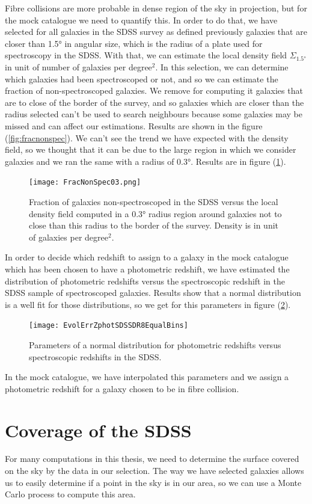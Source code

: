 %
Fibre collisions are more probable in dense region of the sky in projection,
but for the mock catalogue we need to quantify this. In order to do that, we
have selected for all galaxies in the SDSS survey as defined previously
galaxies that are closer than 1.5° in angular size, which is the radius
of a plate used for spectroscopy in the SDSS\@. With that, we can estimate the
local density field $\Sigma_{1.5°}$ in unit of number of galaxies per
degree$^2$. In this selection, we can determine which galaxies had been
spectroscoped or not, and so we can estimate the fraction of non-spectroscoped
galaxies. We remove for computing it galaxies that are to close of the border
of the survey, and so galaxies which are closer than the radius selected can't
be used to search neighbours because some galaxies may be missed and can affect
our estimations. Results are shown in the figure (\ref{fig:fracnonspec}). We
can't see the trend we have expected with the density field, so we thought that
it can be due to the large region in which we consider galaxies and we ran the
same with a radius of 0.3°. Results are in figure
(\ref{fig:fracnonspec0.3}).
%
\begin{figure}[htb]
    \centering
    \texttt{[image: FracNonSpec03.png]}
    \caption{Fraction of galaxies non-spectroscoped in the SDSS versus the
    local density field computed in a 0.3° radius region around galaxies not to
close than this radius to the border of the survey. Density is in unit of
galaxies per degree$^2$.}
\label{fig:fracnonspec0.3}
\end{figure}

In order to decide which redshift to assign to a galaxy in the mock catalogue
which has been chosen to have a photometric redshift, we have estimated the
distribution of photometric redshifts versus the spectroscopic redshift in the
SDSS sample of spectroscoped galaxies. Results show that a normal distribution
is a well fit for those distributions, so we get for this parameters in figure
(\ref{fig:evolnormred}).
%
\begin{figure}[htb]
    \centering
    \texttt{[image: EvolErrZphotSDSSDR8EqualBins]}
    \caption{Parameters of a normal distribution for photometric redshifts
    versus spectroscopic redshifts in the SDSS.}
\label{fig:evolnormred}
\end{figure}

In the mock catalogue, we have interpolated this parameters and we assign a
photometric redshift for a galaxy chosen to be in fibre collision.
%
\section{Coverage of the SDSS}
%
For many computations in this thesis, we need to determine the surface covered
on the sky by the data in our selection. The way we have selected galaxies
allows us to easily determine if a point in the sky is in our area, so we can
use a Monte Carlo process to compute this area.

